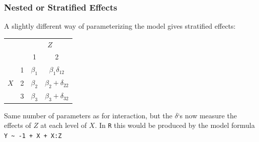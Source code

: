 \documentclass[xcolor={table}]{beamer}
\begin{document}
\begin{frame}[fragile]\frametitle{Nested or Stratified Effects}

A slightly different way of parameterizing the model gives stratified effects:

\begin{center}
\begin{tabular}{c c c c}
&&\multicolumn{2}{c}{$Z$}\\
&&1&2\\
\hline
   &1&$\beta_1$&$\beta_1\delta_{12}$\\
$X$&2&$\beta_2$&$\beta_2+\delta_{22}$\\
   &3&$\beta_3$&$\beta_3+\delta_{32}$\\
\end{tabular}
\end{center}

Same number of parameters as for interaction, but the $\delta$`s now measure the effects of $Z$ at each level of $X$. In \texttt{R} this would be produced by the model formula \verb|Y ~ -1 + X + X:Z |

\end{frame}


\end{document}
